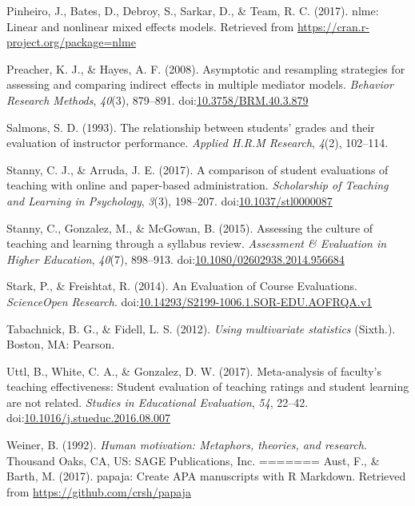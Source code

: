 \documentclass[man]{apa6}
\theoremstyle{definition}
\theoremstyle{definition}
\theoremstyle{definition}
\theoremstyle{remark}
\begin{document}
\hypertarget{ref-Pinheiro2017}{}
Pinheiro, J., Bates, D., Debroy, S., Sarkar, D., \& Team, R. C. (2017).
nlme: Linear and nonlinear mixed effects models. Retrieved from
\url{https://cran.r-project.org/package=nlme}

\hypertarget{ref-Preacher2008}{}
Preacher, K. J., \& Hayes, A. F. (2008). Asymptotic and resampling
strategies for assessing and comparing indirect effects in multiple
mediator models. \emph{Behavior Research Methods}, \emph{40}(3),
879--891.
doi:\href{https://doi.org/10.3758/BRM.40.3.879}{10.3758/BRM.40.3.879}

\hypertarget{ref-Salmons1993}{}
Salmons, S. D. (1993). The relationship between students' grades and
their evaluation of instructor performance. \emph{Applied H.R.M
Research}, \emph{4}(2), 102--114.

\hypertarget{ref-Stanny2017}{}
Stanny, C. J., \& Arruda, J. E. (2017). A comparison of student
evaluations of teaching with online and paper-based administration.
\emph{Scholarship of Teaching and Learning in Psychology}, \emph{3}(3),
198--207.
doi:\href{https://doi.org/10.1037/stl0000087}{10.1037/stl0000087}

\hypertarget{ref-Stanny2015}{}
Stanny, C., Gonzalez, M., \& McGowan, B. (2015). Assessing the culture
of teaching and learning through a syllabus review. \emph{Assessment \&
Evaluation in Higher Education}, \emph{40}(7), 898--913.
doi:\href{https://doi.org/10.1080/02602938.2014.956684}{10.1080/02602938.2014.956684}

\hypertarget{ref-Stark2014}{}
Stark, P., \& Freishtat, R. (2014). An Evaluation of Course Evaluations.
\emph{ScienceOpen Research}.
doi:\href{https://doi.org/10.14293/S2199-1006.1.SOR-EDU.AOFRQA.v1}{10.14293/S2199-1006.1.SOR-EDU.AOFRQA.v1}

\hypertarget{ref-Tabachnick2012}{}
Tabachnick, B. G., \& Fidell, L. S. (2012). \emph{Using multivariate
statistics} (Sixth.). Boston, MA: Pearson.

\hypertarget{ref-Uttl2017}{}
Uttl, B., White, C. A., \& Gonzalez, D. W. (2017). Meta-analysis of
faculty's teaching effectiveness: Student evaluation of teaching ratings
and student learning are not related. \emph{Studies in Educational
Evaluation}, \emph{54}, 22--42.
doi:\href{https://doi.org/10.1016/j.stueduc.2016.08.007}{10.1016/j.stueduc.2016.08.007}

\hypertarget{ref-Weiner1992}{}
Weiner, B. (1992). \emph{Human motivation: Metaphors, theories, and
research}. Thousand Oaks, CA, US: SAGE Publications, Inc.
=======
\leavevmode\hypertarget{ref-Aust2017}{}%
Aust, F., \& Barth, M. (2017). papaja: Create APA manuscripts with R Markdown. Retrieved from \url{https://github.com/crsh/papaja}
\end{document}
